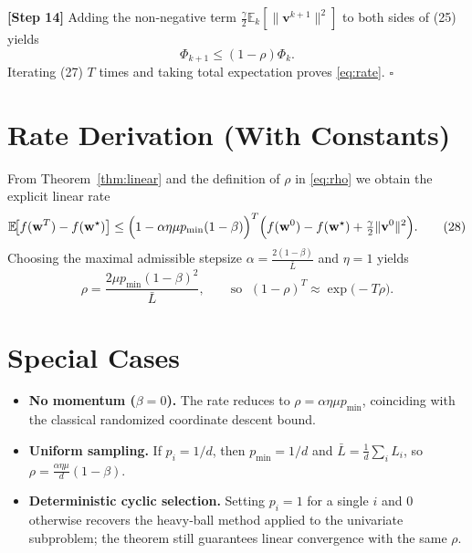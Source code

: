 \documentclass[11pt]{article}
\newcommand{\E}{\mathbb{E}}
\begin{document}
\noindent\textbf{[Step 14]}   Adding the non‑negative term
$\frac{\gamma}{2}\E_{k}[\|\mathbf v^{k+1}\|^{2}]$ to both sides of (25) yields
\[
\Phi_{k+1}\le (1-\rho)\Phi_{k}.
\tag{27}
\]
Iterating (27) $T$ times and taking total expectation proves
\eqref{eq:rate}.
\hfill $\square$

\section*{Rate Derivation (With Constants)}
From Theorem~\ref{thm:linear} and the definition of $\rho$ in \eqref{eq:rho}
we obtain the explicit linear rate
\[
\E\!\bigl[f(\mathbf w^{T})-f(\mathbf w^{\star})\bigr]
\le
\Bigl(1-\alpha\eta\mu p_{\min}(1-\beta)\Bigr)^{T}
\Bigl(f(\mathbf w^{0})-f(\mathbf w^{\star})+\tfrac{\gamma}{2}\|\mathbf v^{0}\|^{2}\Bigr).
\tag{28}
\]
Choosing the maximal admissible stepsize
$\alpha = \frac{2(1-\beta)}{\bar L}$ and $\eta=1$ yields
\[
\rho = \frac{2\mu p_{\min}(1-\beta)^{2}}{\bar L},
\qquad
\text{so } \; (1-\rho)^{T}\approx \exp\!\bigl(-T\rho\bigr).
\tag{29}
\]

\section*{Special Cases}
\begin{itemize}
\item \textbf{No momentum ($\beta=0$).}  The rate reduces to
$\rho = \alpha\eta\mu p_{\min}$, coinciding with the classical
randomized coordinate descent bound.
\item \textbf{Uniform sampling.}  If $p_i=1/d$, then $p_{\min}=1/d$ and
$\bar L=\frac{1}{d}\sum_i L_i$, so
$\rho = \frac{\alpha\eta\mu}{d}(1-\beta)$.
\item \textbf{Deterministic cyclic selection.}  Setting $p_i=1$ for a
single $i$ and $0$ otherwise recovers the heavy‑ball method applied to
the univariate subproblem; the theorem still guarantees linear convergence
with the same $\rho$.
\end{itemize}
\end{document}
